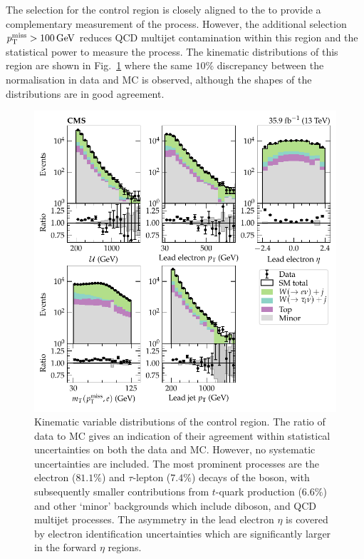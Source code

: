 The selection for the \eleplusjets control region is closely aligned to the \muplusjets to provide a complementary measurement of the \IWlvj process. However, the additional selection ${p_{\text{T}}^{\mathrm{miss}}>\SI{100}{GeV}}$ reduces QCD multijet contamination within this region and the statistical power to measure the \IWlvj process. The kinematic distributions of this region are shown in Fig.~\ref{fig:eleplusjets} where the same $10\%$ discrepancy between the normalisation in data and MC is observed, although the shapes of the distributions are in good agreement.
%
\begin{figure}[htb]
    \centering
    \includegraphics{chapters/042_backgrounds/images/singleele_dists.pdf}
    \caption[Single electron final state kinematics.]{
        Kinematic variable distributions of the \eleplusjets control region. The ratio of data to MC gives an indication of their agreement within statistical uncertainties on both the data and MC. However, no systematic uncertainties are included. The most prominent processes are the electron ($81.1\%$) and $\tau$-lepton ($7.4\%$) decays of the \PW boson, with subsequently smaller contributions from $t$-quark production ($6.6\%$) and other `minor' backgrounds which include diboson, \IDYee and QCD multijet processes. The asymmetry in the lead electron $\eta$ is covered by electron identification uncertainties which are significantly larger in the forward $\eta$ regions.
    }
    \label{fig:eleplusjets}
\end{figure}
